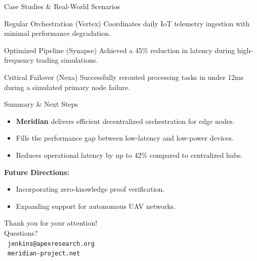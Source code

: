 \begin{frame}{Case Studies \& Real-World Scenarios}
  \begin{block}{Regular Orchestration (Vertex)}
    Coordinates daily IoT telemetry ingestion with minimal performance degradation.
  \end{block}
  
  \begin{exampleblock}{Optimized Pipeline (Synapse)}
    Achieved a 45\% reduction in latency during high-frequency trading simulations.
  \end{exampleblock}
  
  \begin{alertblock}{Critical Failover (Nexa)}
    Successfully rerouted processing tasks in under 12ms during a simulated primary node failure.
  \end{alertblock}
\end{frame}

\begin{frame}{Summary \& Next Steps}
  \begin{itemize}
    \item \textbf{Meridian} delivers efficient decentralized orchestration for edge nodes.
    \item Fills the performance gap between low-latency and low-power devices.
    \item Reduces operational latency by up to 42\% compared to centralized hubs.
  \end{itemize}
  \vfill
  \textbf{Future Directions:}
  \begin{itemize}
    \item Incorporating zero-knowledge proof verification.
    \item Expanding support for autonomous UAV networks.
  \end{itemize}
\end{frame}

\begin{frame}[focus]
  Thank you for your attention! \\
  \vspace{1cm}
  Questions? \\
  \vspace{0.5cm}
  \faEnvelope\ \texttt{jenkins@apexresearch.org} \\
  \faGlobe\ \texttt{meridian-project.net}
\end{frame}
